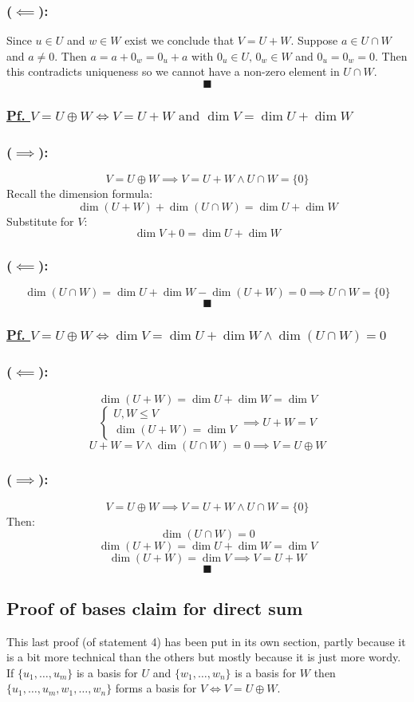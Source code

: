\documentclass[12pt]{article}
\begin{document}
\subsubsection*{(\(\impliedby\)):}
Since \(u\in U\) and \(w\in W\) exist we conclude that \(V=U+W\). Suppose \(a\in U\cap W\) and \(a\ne0\). Then \(a=a+0_w=0_u+a\) with \(0_u\in U,\,0_w\in W\) and \(0_u=0_w=0\). Then this contradicts uniqueness so we cannot have a non-zero element in \(U\cap W\).
\[\blacksquare\]
\subsubsection*{\underline{Pf. \(V=U\oplus W\iff V=U+W \text{ and } \dim{V}=\dim{U}+\dim{W}\)}}
\subsubsection*{(\(\implies\)):}
\[V=U\oplus W\implies V=U+W\land U\cap W=\{0\}\]
Recall the dimension formula:
\[\dim{(U+W)}+\dim{(U\cap W)}=\dim{U}+\dim{W}\]
Substitute for \(V\):
\[\dim{V}+0=\dim{U}+\dim{W}\]
\subsubsection*{(\(\impliedby\)):}
\[\dim{(U\cap W)}=\dim{U}+\dim{W}-\dim{(U+W)}=0\implies U\cap W=\{0\}\]
\[\blacksquare\]
\subsubsection*{\underline{Pf. \(V=U\oplus W\iff \dim{V}=\dim{U}+\dim{W}\land \dim{(U\cap W)}=0\)}}
\subsubsection*{(\(\impliedby\)):}
\[\dim{(U+W)}=\dim{U}+\dim{W}=\dim{V}\]
\[\begin{cases}
    U,W\leqslant V \\
    \dim{(U+W)=\dim{V}}
\end{cases}\implies U+W=V\]
\[U+W=V\land \dim{(U\cap W)=0\implies V=U\oplus W}\]
\subsubsection*{(\(\implies\)):}
\[V=U\oplus W\implies V=U+W\land U\cap W=\{0\}\]
Then:
\[\dim{(U\cap W)}=0\]
\[\dim{(U+W)}=\dim{U}+\dim{W}=\dim{V}\]
\[\dim{(U+W)}=\dim{V}\implies V=U+W\]
\[\blacksquare\]
\subsection*{Proof of bases claim for direct sum}
This last proof (of statement 4) has been put in its own section, partly because it is a bit more technical than the others but mostly because it is just more wordy. If \(\{u_1,\dots,u_m\}\) is a basis for \(U\) and \(\{w_1,\dots,w_n\}\) is a basis for \(W\) then \(\{u_1,\dots,u_m,w_1,\dots,w_n\}\) forms a basis for \(V\iff V=U\oplus W\).
\end{document}
